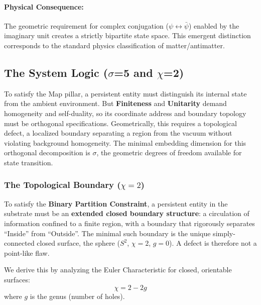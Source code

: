 \paragraph{Physical Consequence:}
The geometric requirement for complex conjugation ($\psi \leftrightarrow \bar{\psi}$) enabled by the imaginary unit creates a strictly bipartite state space. This emergent distinction corresponds to the standard physics classification of matter/antimatter.

\subsection{The System Logic (\texorpdfstring{$\sigma$=5}{sigma=5} and \texorpdfstring{$\chi$=2}{chi=2})}
\label{sec:the_system_logic}

To satisfy the Map pillar, a persistent entity must distinguish its internal state from the ambient environment. But \textbf{Finiteness} and \textbf{Unitarity} demand homogeneity and self-duality, so its coordinate address and boundary topology must be orthogonal specifications. Geometrically, this requires a topological defect, a localized boundary separating a region from the vacuum without violating background homogeneity. The minimal embedding dimension for this orthogonal decomposition is $\sigma$, the geometric degrees of freedom available for state transition.

\subsubsection{The Topological Boundary (\texorpdfstring{$\chi=2$}{chi=2})}
\label{sec:topological_boundary}

To satisfy the \textbf{Binary Partition Constraint}, a persistent entity in the substrate must be an \textbf{extended closed boundary structure}: a circulation of information confined to a finite region, with a boundary that rigorously separates ``Inside'' from ``Outside''. The minimal such boundary is the unique simply-connected closed surface, the sphere ($S^2$, $\chi = 2$, $g = 0$). A defect is therefore not a point-like flaw.

We derive this by analyzing the Euler Characteristic for closed, orientable surfaces:
\begin{equation}
    \chi = 2 - 2g
\end{equation}
where $g$ is the genus (number of holes).

